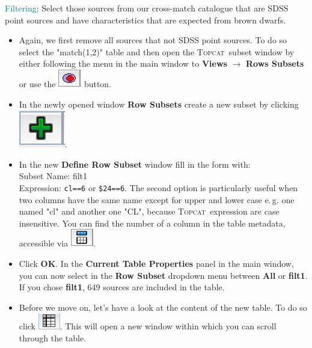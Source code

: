 \documentclass [a4paper, 12pt]{article}
\newcommand{\topcat}{{\textsc{Topcat}}}
\begin{document}
\noindent \textcolor{teal}{Filtering}: Select those sources from our 
cross-match catalogue that are SDSS point sources and have characteristics that 
are expected from brown dwarfs. 
\begin{itemize}
    \item Again, we first remove all sources that not SDSS point sources. To do 
    so select the "match(1,2)" table and then open the \topcat\ subset window 
    by either following the menu in the main 
    window to \textbf{Views} $\rightarrow$ \textbf{Rows Subsets} or use the 
    \includegraphics[width=0.04 
    \textwidth]{../images/topcat_button_subset.jpg} button. 
    \item In the newly opened window \textbf{Row Subsets} create a new subset 
    by clicking \includegraphics[width=0.04 
    \textwidth]{../images/topcat_button_add.jpg}. 
    \item In the new \textbf{Define Row Subset} window fill in the form with:\\
    Subset Name: filt1\\
    Expression: \texttt{cl==6} or \texttt{\$24==6}. The second option is 
    particularly useful when two columns have the same name except for upper 
    and lower case e.\,g. one named "cl" and another one "CL", because \topcat\ 
    expression are case insensitive. You can find the number of a column in the 
    table metadata, accessible via \includegraphics[width=0.04 
    \textwidth]{../images/topcat_button_metadata.jpg}. 
    \item Click \textbf{OK}. In the \textbf{Current Table Properties} panel in 
    the main window, you can now select in the \textbf{Row Subset} dropdown 
    menu between \textbf{All} or \textbf{filt1}. If you chose \textbf{filt1}, 
    649 sources are included in the table. 
    \item Before we move on, let's have a look at the content of the new table. 
    To do so click \includegraphics[width=0.04 
    \textwidth]{../images/topcat_button_open-tab.jpg}. This will open a new 
    window within 
    which you can scroll through the table. 

\end{itemize}
\end{document}

